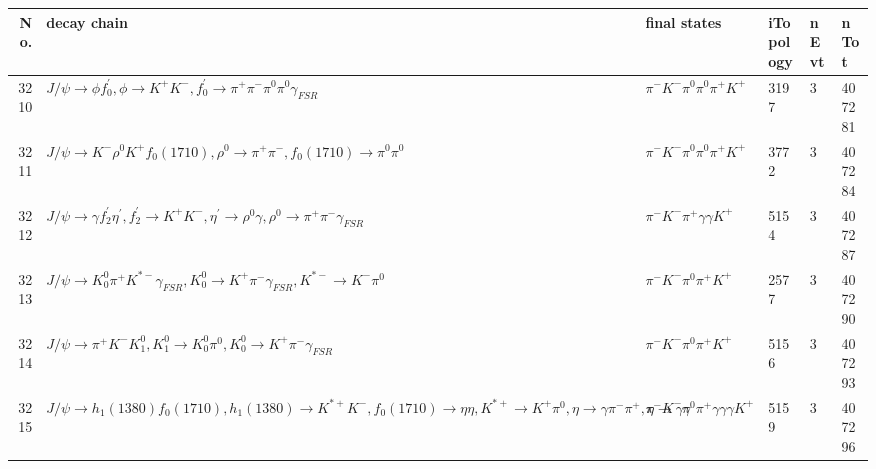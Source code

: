 \begin{table}[htbp] 
\begin{center}
\begin{small}
\begin{tabular}{rlllll}\hline\hline
 No. & decay chain & final states &  iTopology & nEvt & nTot \\\hline
3210&$J/\psi       \rightarrow \phi           f^{'}_{0}     , \phi            \rightarrow K^{+}          K^{-}          , f^{'}_{0}      \rightarrow \pi^{+}        \pi^{-}        \pi^{0}        \pi^{0}        \gamma_{FSR} $&$\pi^{-}        K^{-}          \pi^{0}        \pi^{0}        \pi^{+}        K^{+}          $& 3197&    3&407281\\
3211&$J/\psi       \rightarrow K^{-}          \rho^{0}      K^{+}          f_{0}(1710)    , \rho^{0}       \rightarrow \pi^{+}        \pi^{-}        , f_{0}(1710)     \rightarrow \pi^{0}        \pi^{0}        $&$\pi^{-}        K^{-}          \pi^{0}        \pi^{0}        \pi^{+}        K^{+}          $& 3772&    3&407284\\
3212&$J/\psi       \rightarrow \gamma       f_2^{'}       \eta^{\prime} , f_2^{'}        \rightarrow K^{+}          K^{-}          , \eta^{\prime}  \rightarrow \rho^{0}      \gamma       , \rho^{0}       \rightarrow \pi^{+}        \pi^{-}        \gamma_{FSR} $&$\pi^{-}        K^{-}          \pi^{+}        \gamma       \gamma       K^{+}          $& 5154&    3&407287\\
3213&$J/\psi       \rightarrow K_0^{0}        \pi^{+}        K^{*-}         \gamma_{FSR} , K_0^{0}         \rightarrow K^{+}          \pi^{-}        \gamma_{FSR} , K^{*-}          \rightarrow K^{-}          \pi^{0}        $&$\pi^{-}        K^{-}          \pi^{0}        \pi^{+}        K^{+}          $& 2577&    3&407290\\
3214&$J/\psi       \rightarrow \pi^{+}        K^{-}          K_1^{0}        , K_1^{0}         \rightarrow K_0^{0}        \pi^{0}        , K_0^{0}         \rightarrow K^{+}          \pi^{-}        \gamma_{FSR} $&$\pi^{-}        K^{-}          \pi^{0}        \pi^{+}        K^{+}          $& 5156&    3&407293\\
3215&$J/\psi       \rightarrow h_{1}(1380)    f_{0}(1710)    , h_{1}(1380)     \rightarrow K^{*+}         K^{-}          , f_{0}(1710)     \rightarrow \eta          \eta          , K^{*+}          \rightarrow K^{+}          \pi^{0}        , \eta           \rightarrow \gamma       \pi^{-}        \pi^{+}        , \eta           \rightarrow \gamma       \gamma       $&$\pi^{-}        K^{-}          \pi^{0}        \pi^{+}        \gamma       \gamma       \gamma       K^{+}          $& 5159&    3&407296\\

\end{tabular}
\end{small}
\end{center}
\end{table}
